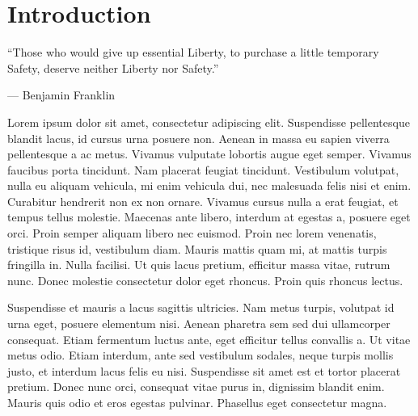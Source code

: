 \chapter{Introduction}

\epigraph{``Those who would give up essential Liberty, to purchase a little temporary Safety, deserve neither Liberty nor Safety.''}{--- \textup{Benjamin Franklin} }

 Lorem ipsum dolor sit amet, consectetur adipiscing elit. Suspendisse pellentesque blandit lacus, id cursus urna posuere non. Aenean in massa eu sapien viverra pellentesque a ac metus. Vivamus vulputate lobortis augue eget semper. Vivamus faucibus porta tincidunt. Nam placerat feugiat tincidunt. Vestibulum volutpat, nulla eu aliquam vehicula, mi enim vehicula dui, nec malesuada felis nisi et enim. Curabitur hendrerit non ex non ornare. Vivamus cursus nulla a erat feugiat, et tempus tellus molestie. Maecenas ante libero, interdum at egestas a, posuere eget orci. Proin semper aliquam libero nec euismod. Proin nec lorem venenatis, tristique risus id, vestibulum diam. Mauris mattis quam mi, at mattis turpis fringilla in. Nulla facilisi. Ut quis lacus pretium, efficitur massa vitae, rutrum nunc. Donec molestie consectetur dolor eget rhoncus. Proin quis rhoncus lectus.

Suspendisse et mauris a lacus sagittis ultricies. Nam metus turpis, volutpat id urna eget, posuere elementum nisi. Aenean pharetra sem sed dui ullamcorper consequat. Etiam fermentum luctus ante, eget efficitur tellus convallis a. Ut vitae metus odio. Etiam interdum, ante sed vestibulum sodales, neque turpis mollis justo, et interdum lacus felis eu nisi. Suspendisse sit amet est et tortor placerat pretium. Donec nunc orci, consequat vitae purus in, dignissim blandit enim. Mauris quis odio et eros egestas pulvinar. Phasellus eget consectetur magna.